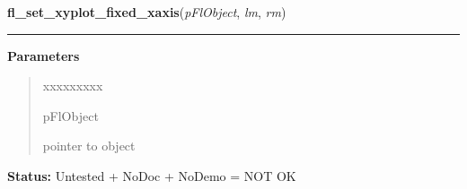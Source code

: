    \label{xformslib:flxyplot:fl_set_xyplot_fixed_xaxis}

    \vspace{0.5ex}

\hspace{.8\funcindent}\begin{boxedminipage}{\funcwidth}

    \raggedright \textbf{fl\_set\_xyplot\_fixed\_xaxis}(\textit{pFlObject}, \textit{lm}, \textit{rm})

    \vspace{-1.5ex}

    \rule{\textwidth}{0.5\fboxrule}
\setlength{\parskip}{2ex}
\setlength{\parskip}{1ex}
      \textbf{Parameters}
      \vspace{-1ex}

      \begin{quote}
        \begin{Ventry}{xxxxxxxxx}

          \item[pFlObject]

          pointer to object

        \end{Ventry}

      \end{quote}

\textbf{Status:} Untested + NoDoc + NoDemo = NOT OK



    \end{boxedminipage}

    \label{xformslib:flxyplot:fl_set_xyplot_fixed_yaxis}

    \vspace{0.5ex}

